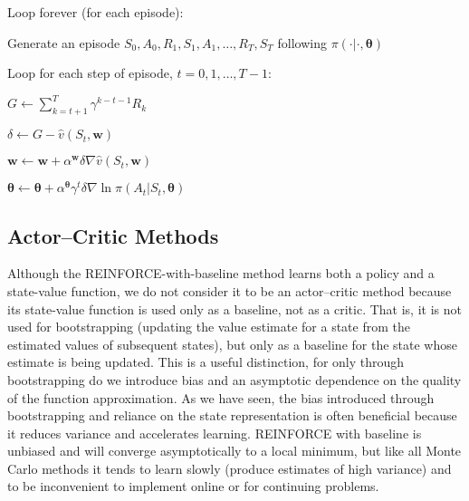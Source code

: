 {\begin{tcolorbox}[colback=black!7!white,colframe=black!75!white,title=\textbf{REINFORCE with Baseline (episodic), for $\pi_\theta\approx\pi_* $}]
    Loop forever (for each episode):

        \qquad Generate an episode $S_0, A_0, R_1, S_1, A_1,\dots,R_T,S_T$ following $\pi(\cdot|\cdot, \bm{\theta})$

        \qquad Loop for each step of episode, $t=0,1,\dots, T-1$:

        \qquad\qquad $G\leftarrow\sum_{k=t+1}^T\gamma^{k-t-1}R_k$

        \qquad\qquad $\delta\leftarrow G-\hat{v}(S_t,\bm{w})$

        \qquad\qquad $\bm{w}\leftarrow\bm{w}+\alpha^{\bm{w}}\delta\nabla\hat{v}(S_t, \bm{w})$

        \qquad\qquad $\bm{\theta}\leftarrow \bm{\theta}+\alpha^{\bm{\theta}}\gamma^t\delta\nabla\ln\pi(A_t|S_t, \bm{\theta})$
\end{tcolorbox}

\subsection{Actor–Critic Methods}
Although the REINFORCE-with-baseline method learns both a policy and a state-value function, we do not consider it to be an actor–critic method because its state-value function
is used only as a baseline, not as a critic. That is, it is not used for bootstrapping (updating the value estimate for a state from the estimated values of subsequent states), 
but only as a baseline for the state whose estimate is being updated.
This is a useful distinction, for only through bootstrapping do we introduce bias and an asymptotic dependence
on the quality of the function approximation. As we have seen, the bias introduced
through bootstrapping and reliance on the state representation is often beneficial because
it reduces variance and accelerates learning. REINFORCE with baseline is unbiased
and will converge asymptotically to a local minimum, but like all Monte Carlo methods
it tends to learn slowly (produce estimates of high variance) and to be inconvenient
to implement online or for continuing problems.\\

}
